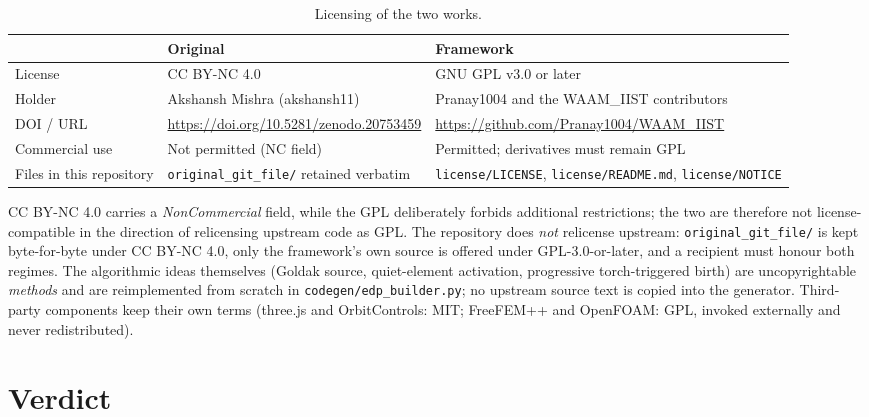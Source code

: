 \documentclass[10pt,a4paper]{article}
\newcommand{\code}[1]{\texttt{#1}}
\newcommand{\file}[1]{\texttt{\small #1}}
\begin{document}
\begin{table}[h!]
\centering
\caption{Licensing of the two works.}
\label{tab:lic}
\small
\begin{tabularx}{\linewidth}{@{}l X X@{}}
\toprule
& \textbf{Original} & \textbf{Framework} \\
\midrule
License & CC BY-NC 4.0 & GNU GPL v3.0 or later \\
\addlinespace
Holder & Akshansh Mishra (akshansh11) & Pranay1004 and the WAAM\_IIST
contributors \\
\addlinespace
DOI / URL & \url{https://doi.org/10.5281/zenodo.20753459} &
\url{https://github.com/Pranay1004/WAAM_IIST} \\
\addlinespace
Commercial use & Not permitted (NC field) & Permitted; derivatives must remain
GPL \\
\addlinespace
Files in this repository & \code{original\_git\_file/} retained verbatim &
\code{license/LICENSE}, \code{license/README.md}, \code{license/NOTICE} \\
\bottomrule
\end{tabularx}
\end{table}

\noindent CC BY-NC 4.0 carries a \emph{NonCommercial} field, while the GPL
deliberately forbids additional restrictions; the two are therefore not
license-compatible in the direction of relicensing upstream code as GPL. The
repository does \emph{not} relicense upstream: \code{original\_git\_file/} is
kept byte-for-byte under CC BY-NC 4.0, only the framework's own source is
offered under GPL-3.0-or-later, and a recipient must honour both regimes. The
algorithmic ideas themselves (Goldak source, quiet-element activation,
progressive torch-triggered birth) are uncopyrightable \emph{methods} and are
reimplemented from scratch in \file{codegen/edp\_builder.py}; no upstream source
text is copied into the generator. Third-party components keep their own terms
(three.js and OrbitControls: MIT; FreeFEM++ and OpenFOAM: GPL, invoked
externally and never redistributed).

\section{Verdict}
\end{document}
